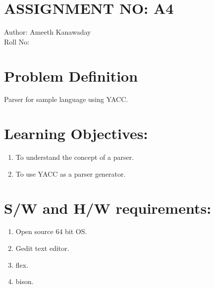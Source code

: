 \documentclass[10pt,a4paper]{article}
\begin{document}
\section{ASSIGNMENT NO: A4}
Author:\:   Ameeth Kanawaday\\
Roll No:\\
\section{Problem Definition}
Parser for sample language using YACC.


\section{Learning Objectives:}
\begin{enumerate}
\item To understand the concept of a parser.
\item To use YACC as a parser generator.
\end{enumerate}

\section{S/W and H/W requirements:}
\begin{enumerate}
\item Open source 64 bit OS.
\item Gedit text editor.
\item flex.
\item bison.
\end{enumerate}
\end{document}
